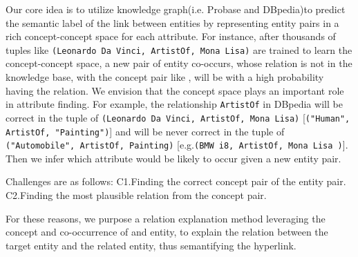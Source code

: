 
Our core idea is to utilize knowledge graph(i.e. \ac{Probase} and \ac{DBpedia})to predict the semantic label of the link between entities by representing entity pairs in a rich concept-concept space for each attribute.
For instance, after thousands of tuples like {\tt(Leonardo Da Vinci, ArtistOf, Mona Lisa)} are trained to learn the concept-concept space, a new pair of entity co-occurs, whose relation is not in the knowledge base, with the concept pair like , will be with a high probability having the  relation.
We envision that the concept space plays an important role in attribute finding.
For example, the relationship {\tt ArtistOf} in \ac{DBpedia} will be correct in the tuple of {\tt(Leonardo Da Vinci, ArtistOf, Mona Lisa)} [{\tt("Human", ArtistOf, "Painting")}] and will be never correct in the tuple of {\tt ("Automobile", ArtistOf, Painting)} [e.g.{\tt(BMW i8, ArtistOf, Mona Lisa )}].
Then we infer which attribute would be likely to occur given a new entity pair.

Challenges are as follows:
C1.Finding the correct concept pair of the entity pair.
C2.Finding the most plausible relation from the concept pair.




For these reasons, we purpose a relation explanation method leveraging the concept and co-occurrence of and entity, to explain the relation between the target entity and the related entity, thus semantifying the hyperlink.
